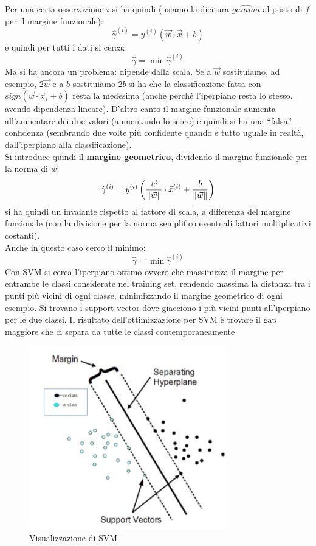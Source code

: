 Per una certa osservazione $i$ si ha quindi (usiamo la dicitura $\hat{gamma}$ al
posto di $f$ per il margine funzionale):
\[\hat{\gamma}^{(i)}=y^{(i)}(\vec{w}\cdot\vec{x}+b)\]
e quindi per tutti i dati si cerca:
\[\hat{\gamma}=\min \hat{\gamma}^{(i)}\]
Ma si ha ancora un problema: dipende dalla scala. Se a $\vec{w}$ sostituiamo,
ad esempio, $2\vec{w}$ e a $b$ sostituiamo $2b$ si ha che la classificazione
fatta con $sign(\vec{w}\cdot\vec{x}_i+b)$ resta la medesima (anche perché
l'iperpiano resta lo stesso, avendo dipendenza lineare). D'altro canto il
margine funzionale aumenta all'aumentare dei due valori (aumentando lo score) e
quindi si ha una ``falsa'' confidenza (sembrando due volte più confidente quando
è tutto uguale in realtà, dall'iperpiano alla classificazione).\\
Si introduce quindi il \textbf{margine geometrico}, dividendo il margine
funzionale per la norma di $\vec{w}$:
\[\hat{\gamma}^{(i)}=y^{(i)}\left(\frac{\vec{w}}{\norm{\vec{w}}}
    \cdot\vec{x}^{(i)}+\frac{b}{\norm{\vec{w}}}\right)\]
si ha quindi un invaiante rispetto al fattore di scala, a differenza del margine
funzionale (con la divisione per la norma semplifico eventuali fattori
moltiplicativi costanti).\\
Anche in questo caso cerco il minimo:
\[\hat{\gamma}=\min \hat{\gamma}^{(i)}\]
Con SVM si cerca l'iperpiano ottimo ovvero che massimizza il margine per
entrambe le classi considerate nel training set, rendendo massima la distanza
tra i punti più vicini di ogni classe, minimizzando il margine geometrico di
ogni esempio. Si trovano i support vector dove giacciono i più vicini punti
all'iperpiano per le due classi. Il risultato dell'ottimizzazione per SVM è
trovare il gap maggiore che ci separa da tutte le classi contemporaneamente
\begin{figure}[H]
  \centering
  \includegraphics[scale = 0.7]{img/svm.jpg}
  \caption{Visualizzazione di SVM}
  \label{fig:svm}
\end{figure}
